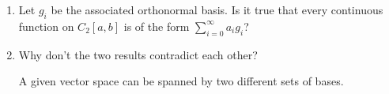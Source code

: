 \documentclass[12pt,letterpaper,reqno]{amsart}
\begin{document}
\begin{enumerate}[1.]
\begin{enumerate}
\begin{flushleft}
\end{flushleft}
\vspace{1.5in}
\item Let $g_i$ be the associated orthonormal basis.  Is it true that every continuous function on $C_2[a,b]$ is of the form $\sum_{i=0}^\infty a_ig_i$? 
\vspace{2.5in}
\item Why don't the two results contradict each other?
\begin{flushleft}
A given vector space can be spanned by two different sets of bases.
\end{flushleft}
\end{enumerate}
\end{enumerate}
\end{document}
